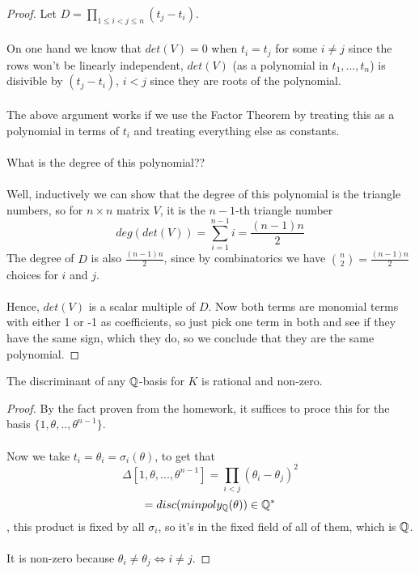 \begin{proof}
Let $D = \prod_{1 \leq i < j \leq n} (t_j - t_i)$.\\\\
On one hand we know that $det(V) = 0$ when $t_i = t_j$ for some $i \neq j$ since the rows won't be linearly independent, $det(V)$ (as a polynomial in $t_1, ..., t_n$) is disivible by $(t_j - t_i)$, $i < j$ since they are roots of the polynomial.\\\\
The above argument works if we use the Factor Theorem by treating this as a polynomial in terms of $t_i$ and treating everything else as constants.\\\\
What is the degree of this polynomial??\\\\
Well, inductively we can show that the degree of this polynomial is the triangle numbers, so for $n \times n$ matrix $V$, it is the $n-1$-th triangle number
\[deg(det(V)) = \sum_{i = 1}^{n-1} i = \frac{(n-1)n}{2}\]
The degree of $D$ is also $\frac{(n-1)n}{2}$, since by combinatorics we have ${n \choose 2} = \frac{(n-1)n}{2}$ choices for $i$ and $j$.\\\\
Hence, $det(V)$ is a scalar multiple of $D$. Now both terms are monomial terms with either 1 or -1 as coefficients, so just pick one term in both and see if they have the same sign, which they do, so we conclude that they are the same polynomial.
\end{proof}

\begin{theorem}
The discriminant of any $\mathbb{Q}$-basis for $K$ is rational and non-zero.
\end{theorem}

\begin{proof}
By the fact proven from the homework, it suffices to proce this for the basis $\{1, \theta, .., \theta^{n-1}\}$.\\\\
Now we take $t_i = \theta_i = \sigma_i(\theta)$, to get that
\[\Delta[1, \theta, ..., \theta^{n-1}] =\prod_{i < j} (\theta_i - \theta_j)^2\]
\[ = disc(minpoly_{\mathbb{Q}}(\theta)) \in \mathbb{Q}^*\]
, this product is fixed by all $\sigma_i$, so it's in the fixed field of all of them, which is $\mathbb{Q}$.\\\\
It is non-zero because $\theta_i \neq \theta_j \iff i \neq j$.
\end{proof}

